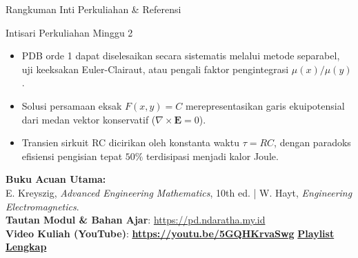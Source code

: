 \documentclass[aspectratio=169,10pt]{beamer}
\begin{document}
\begin{frame}{Rangkuman Inti Perkuliahan \& Referensi}
  \begin{exampleblock}{Intisari Perkuliahan Minggu 2}
    \begin{itemize}
      \item PDB orde 1 dapat diselesaikan secara sistematis melalui metode separabel, uji keeksakan Euler-Clairaut, atau pengali faktor pengintegrasi $\mu(x)/\mu(y)$.
      \item Solusi persamaan eksak $F(x,y)=C$ merepresentasikan garis ekuipotensial dari medan vektor konservatif ($\nabla \times \mathbf{E} = 0$).
      \item Transien sirkuit RC dicirikan oleh konstanta waktu $\tau = RC$, dengan paradoks efisiensi pengisian tepat $50\%$ terdisipasi menjadi kalor Joule.
    \end{itemize}
  \end{exampleblock}
  \vspace{0.2cm}
  \begin{center}
    \small \textbf{Buku Acuan Utama:} \\
    E. Kreyszig, \textit{Advanced Engineering Mathematics}, 10th ed. | W. Hayt, \textit{Engineering Electromagnetics}. \\
    \vspace{0.3cm}
    \textbf{Tautan Modul \& Bahan Ajar}: \url{https://pd.ndaratha.my.id} \\[0.12cm]\textbf{Video Kuliah (YouTube)}: {\color{red!85!black}\textbf{\url{https://youtu.be/5GQHKrvaSwg}}} \quad \textbar \quad \href{https://www.youtube.com/playlist?list=PLS5oOZWXZeTw}{\color{unibblue}\textbf{Playlist Lengkap}}
  \end{center}
\end{frame}
\end{document}
